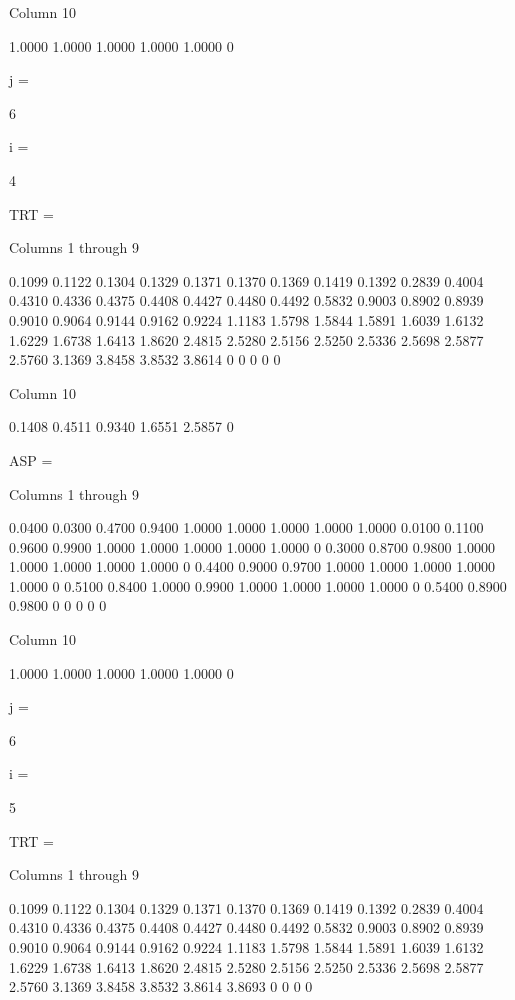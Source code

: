   Column 10

    1.0000
    1.0000
    1.0000
    1.0000
    1.0000
         0


j =

     6


i =

     4


TRT =

  Columns 1 through 9

    0.1099    0.1122    0.1304    0.1329    0.1371    0.1370    0.1369    0.1419    0.1392
    0.2839    0.4004    0.4310    0.4336    0.4375    0.4408    0.4427    0.4480    0.4492
    0.5832    0.9003    0.8902    0.8939    0.9010    0.9064    0.9144    0.9162    0.9224
    1.1183    1.5798    1.5844    1.5891    1.6039    1.6132    1.6229    1.6738    1.6413
    1.8620    2.4815    2.5280    2.5156    2.5250    2.5336    2.5698    2.5877    2.5760
    3.1369    3.8458    3.8532    3.8614         0         0         0         0         0

  Column 10

    0.1408
    0.4511
    0.9340
    1.6551
    2.5857
         0


ASP =

  Columns 1 through 9

    0.0400    0.0300    0.4700    0.9400    1.0000    1.0000    1.0000    1.0000    1.0000
    0.0100    0.1100    0.9600    0.9900    1.0000    1.0000    1.0000    1.0000    1.0000
         0    0.3000    0.8700    0.9800    1.0000    1.0000    1.0000    1.0000    1.0000
         0    0.4400    0.9000    0.9700    1.0000    1.0000    1.0000    1.0000    1.0000
         0    0.5100    0.8400    1.0000    0.9900    1.0000    1.0000    1.0000    1.0000
         0    0.5400    0.8900    0.9800         0         0         0         0         0

  Column 10

    1.0000
    1.0000
    1.0000
    1.0000
    1.0000
         0


j =

     6


i =

     5


TRT =

  Columns 1 through 9

    0.1099    0.1122    0.1304    0.1329    0.1371    0.1370    0.1369    0.1419    0.1392
    0.2839    0.4004    0.4310    0.4336    0.4375    0.4408    0.4427    0.4480    0.4492
    0.5832    0.9003    0.8902    0.8939    0.9010    0.9064    0.9144    0.9162    0.9224
    1.1183    1.5798    1.5844    1.5891    1.6039    1.6132    1.6229    1.6738    1.6413
    1.8620    2.4815    2.5280    2.5156    2.5250    2.5336    2.5698    2.5877    2.5760
    3.1369    3.8458    3.8532    3.8614    3.8693         0         0         0         0

